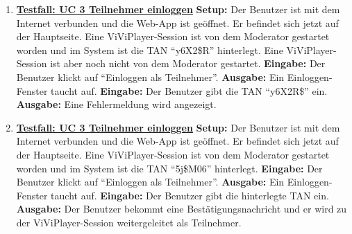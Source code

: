 \begin{enumerate}
	\item \underline{\textbf{Testfall: UC 3 Teilnehmer einloggen}} \linebreak
	\textbf{Setup:} Der Benutzer ist mit dem Internet verbunden und die Web-App ist geöffnet. Er befindet sich jetzt auf der Hauptseite. Eine ViViPlayer-Session ist von dem Moderator gestartet worden und im System ist die TAN ``y6X2\$R'' hinterlegt.
	Eine ViViPlayer-Session ist aber noch nicht von dem Moderator gestartet. \linebreak
	\textbf{Eingabe:} Der Benutzer klickt auf ``Einloggen als Teilnehmer''. \linebreak
	\textbf{Ausgabe:} Ein Einloggen-Fenster taucht auf. \linebreak
	\textbf{Eingabe:} Der Benutzer gibt die TAN ``y6X2R\$'' ein. \linebreak
	\textbf{Ausgabe:} Eine Fehlermeldung wird angezeigt.
	
	\item \underline{\textbf{Testfall: UC 3 Teilnehmer einloggen}} \linebreak
	\textbf{Setup:} Der Benutzer ist mit dem Internet verbunden und die Web-App ist geöffnet. Er befindet sich jetzt auf der Hauptseite. Eine ViViPlayer-Session ist von dem Moderator gestartet worden und im System ist die TAN ``5j\$M06'' hinterlegt. \linebreak
	\textbf{Eingabe:} Der Benutzer klickt auf ``Einloggen als Teilnehmer''. \linebreak
	\textbf{Ausgabe:} Ein Einloggen-Fenster taucht auf. \linebreak
	\textbf{Eingabe:} Der Benutzer gibt die hinterlegte TAN ein. \linebreak
	\textbf{Ausgabe:} Der Benutzer bekommt eine Bestätigungsnachricht und er wird zu der ViViPlayer-Session weitergeleitet als Teilnehmer.


\end{enumerate}
